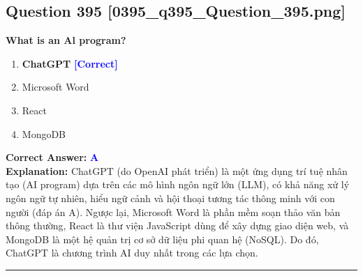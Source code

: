 \documentclass[11pt,a4paper]{article}
\begin{document}
\begin{minipage}{\textwidth}
\subsection*{Question 395 \quad \footnotesize{[0395\_q395\_Question\_395.png]}}
\noindent \textbf{What is an Al program?}

\begin{enumerate}[label=\Alph*.]
    \item \textbf{ChatGPT} \hfill \textcolor{blue}{\textbf{[Correct]}}
    \item Microsoft Word
    \item React
    \item MongoDB
\end{enumerate}

\noindent \textbf{Correct Answer:} \textcolor{blue}{\textbf{A}} \\[2pt]
\noindent \textbf{Explanation:} ChatGPT (do OpenAI phát triển) là một ứng dụng trí tuệ nhân tạo (AI program) dựa trên các mô hình ngôn ngữ lớn (LLM), có khả năng xử lý ngôn ngữ tự nhiên, hiểu ngữ cảnh và hội thoại tương tác thông minh với con người (đáp án A). Ngược lại, Microsoft Word là phần mềm soạn thảo văn bản thông thường, React là thư viện JavaScript dùng để xây dựng giao diện web, và MongoDB là một hệ quản trị cơ sở dữ liệu phi quan hệ (NoSQL). Do đó, ChatGPT là chương trình AI duy nhất trong các lựa chọn.

\par\vspace{0.3cm}
\hrule
\vspace{0.3cm}
\end{minipage}
\end{document}
